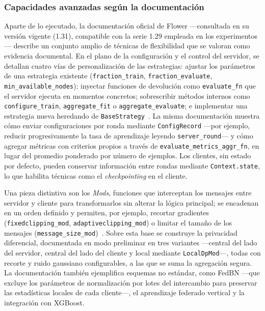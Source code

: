 \subsubsection{Capacidades avanzadas según la documentación}\label{subsec:flex-flower-doc}

Aparte de lo ejecutado, la documentación oficial de Flower —consultada en su versión vigente
(1.31), compatible con la serie 1.29 empleada en los experimentos— describe
un conjunto amplio de técnicas de flexibilidad que se valoran como evidencia
documental. En el plano de la configuración y el control del servidor, se detallan
cuatro vías de personalización de las estrategias: ajustar los parámetros de una
estrategia existente (\texttt{fraction\_\allowbreak train}, \texttt{fraction\_\allowbreak evaluate},
\texttt{min\_\allowbreak available\_\allowbreak nodes}); inyectar funciones de devolución como
\texttt{evaluate\_\allowbreak fn} que el servidor ejecuta en momentos concretos; sobrescribir
métodos internos como \texttt{configure\_\allowbreak train}, \texttt{aggregate\_\allowbreak fit} o
\texttt{aggregate\_\allowbreak evaluate}; e implementar una estrategia nueva heredando de
\texttt{BaseStrategy}~\parencite{flowerDocs}. La misma documentación muestra cómo
enviar configuraciones por ronda mediante \texttt{ConfigRecord} —por ejemplo, reducir
progresivamente la tasa de aprendizaje leyendo \texttt{server\_\allowbreak round}— y cómo agregar
métricas con criterios propios a través de \texttt{evaluate\_\allowbreak metrics\_\allowbreak aggr\_\allowbreak fn}, en
lugar del promedio ponderado por número de ejemplos. Los clientes, sin estado por
defecto, pueden conservar información entre rondas mediante \texttt{Context.state}, lo
que habilita técnicas como el \textit{checkpointing} en el cliente.

Una pieza distintiva son los \textit{Mods}, funciones que interceptan los mensajes
entre servidor y cliente para transformarlos sin alterar la lógica principal; se
encadenan en un orden definido y permiten, por ejemplo, recortar gradientes
(\texttt{fixedclipping\_\allowbreak mod}, \texttt{adaptiveclipping\_\allowbreak mod}) o limitar el tamaño de
los mensajes (\texttt{message\_\allowbreak size\_\allowbreak mod})~\parencite{flowerDocs}. Sobre esta
base se construye la privacidad diferencial, documentada en modo preliminar en tres
variantes —central del lado del servidor, central del lado del cliente y local
mediante \texttt{LocalDpMod}—, todas con recorte y ruido gaussiano configurables, a las
que se suma la agregación segura. La documentación también ejemplifica esquemas no
estándar, como FedBN —que excluye los parámetros de normalización por lotes del
intercambio para preservar las estadísticas locales de cada cliente—, el aprendizaje
federado vertical y la integración con XGBoost.

